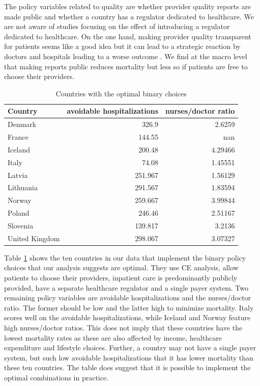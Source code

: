 \documentclass[12pt,english,a4paper]{article}
\begin{document}
The policy variables related to quality are whether provider quality reports are made public and whether a country has a regulator dedicated to healthcare. We are not aware of studies focusing on the effect of introducing a regulator dedicated to healthcare. On the one hand, making provider quality transparent for patients seems like a good idea but it can lead to a strategic reaction by doctors and hospitals leading to a worse outcome \citep{dranoveReportCards2003}. We find at the macro level that making reports public reduces mortality but less so if patients are free to choose their providers.


\begin{table}[htbp]
\caption{\label{tab:org5a4067d}Countries with the optimal binary choices}
\centering
\begin{tabular}{lrr}
Country & avoidable hospitalizations & nurses/doctor ratio\\
\hline
Denmark & 326.9 & 2.6259\\
France & 144.55 & nan\\
Iceland & 200.48 & 4.29466\\
Italy & 74.08 & 1.45551\\
Latvia & 251.967 & 1.56129\\
Lithuania & 291.567 & 1.83594\\
Norway & 259.667 & 3.99844\\
Poland & 246.46 & 2.51167\\
Slovenia & 139.817 & 3.2136\\
United Kingdom & 298.067 & 3.07327\\
\end{tabular}
\end{table}


Table \ref{tab:org5a4067d} shows the ten countries in our data that implement the binary policy choices that our analysis suggests are optimal. They use CE analysis, allow patients to choose their providers, inpatient care is predominantly publicly provided, have a separate healthcare regulator and a single payer system. Two remaining policy variables are avoidable hospitalizations and the nurses/doctor ratio. The former should be low and the latter high to minimize mortality. Italy scores well on the avoidable hospitalizations, while Iceland and Norway feature high nurses/doctor ratios. This does not imply that these countries have the lowest mortality rates as these are also affected by income, healthcare expenditure and lifestyle choices. Further, a country may not have a single payer system, but such low avoidable hospitalizations that it has lower mortality than these ten countries. The table does suggest that it is possible to implement the optimal combinations in practice.
\end{document}
